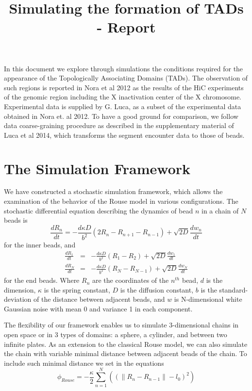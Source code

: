 \documentclass[12pt]{paper}
\begin{document}
\title{Simulating the formation of TADs - Report}
\maketitle
In this document we explore through simulations the conditions required for the appearance of the Topologically Associating Domains (TADs). The observation of such regions is reported in Nora et al 2012 as the results of the HiC experiments of the genomic region including the X inactivation center of the X chromosome. Experimental data is supplied by G. Luca, as a subset of the experimental data obtained in Nora et. al 2012. To have a good ground for comparison, we follow data coarse-graining procedure as described in the supplementary material of Luca et al 2014, which transforms the segment encounter data to those of beads.   

\section{The Simulation Framework}
We have constructed a stochastic simulation framework, which allows the examination of the behavior of the Rouse model in various configurations.
The stochastic differential equation describing the dynamics of bead $n$ in a chain of $N$ beads is 
\begin{equation*}
\frac{dR_n}{dt}= -\frac{d\kappa D}{b^2}\left(2R_n-R_{n+1}-R_{n-1}\right)+\sqrt{2D}\frac{dw_n}{dt}
\end{equation*}
for the  inner beads, and 
\begin{eqnarray*}
\frac{dR_1}{dt}&=& -\frac{d\kappa D}{b^2}\left(R_1-R_{2}\right)+\sqrt{2D}\frac{dw_1}{dt}\\
\frac{dR_N}{dt}&=& -\frac{d\kappa D}{b^2}\left(R_N-R_{N-1}\right)+\sqrt{2D}\frac{dw_N}{dt}
\end{eqnarray*}
for the end beads. Where $R_n$ are the coordinates of the $n^{th}$ bead, $d$ is the dimension, $\kappa$ is the spring constant, $D$ is the diffusion constant, $b$ is the standard-deviation of the distance between adjacent beads, and $w$ is N-dimensional white Gaussian noise with mean 0 and variance 1 in each component. 

The flexibility of our framework enables us to simulate 3-dimensional chains in open space or in 3 types of domains: a sphere, a cylinder, and between two infinite plates. As an extension to the classical Rouse model, we can also simulate the chain with variable minimal distance between adjacent beads of the chain.
To include such minimal distance we set in the equations 
\begin{equation*}
\phi_{Rouse}=-\frac{\kappa}{2}\sum_{n=1}^N\left((\|R_n-R_{n-1}\|-l_0)^2\right)
\end{equation*}
\end{document}

